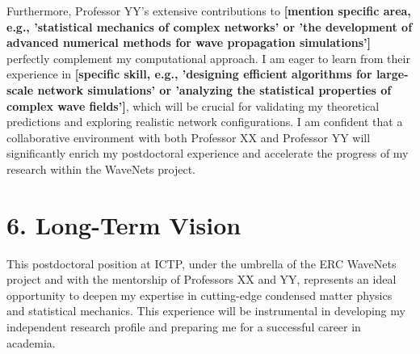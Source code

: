 \documentclass[a4paper, 11pt]{article}
\begin{document}
Furthermore, Professor YY's extensive contributions to \textbf{[mention specific area, e.g., 'statistical mechanics of complex networks' or 'the development of advanced numerical methods for wave propagation simulations']} perfectly complement my computational approach. I am eager to learn from their experience in \textbf{[specific skill, e.g., 'designing efficient algorithms for large-scale network simulations' or 'analyzing the statistical properties of complex wave fields']}, which will be crucial for validating my theoretical predictions and exploring realistic network configurations. I am confident that a collaborative environment with both Professor XX and Professor YY will significantly enrich my postdoctoral experience and accelerate the progress of my research within the WaveNets project.

\section*{6. Long-Term Vision}
This postdoctoral position at ICTP, under the umbrella of the ERC WaveNets project and with the mentorship of Professors XX and YY, represents an ideal opportunity to deepen my expertise in cutting-edge condensed matter physics and statistical mechanics. This experience will be instrumental in developing my independent research profile and preparing me for a successful career in academia.
\end{document}
